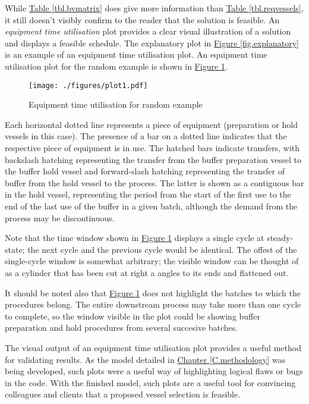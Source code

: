 While \hyperref[tbl.bvmatrix]{Table \ref*{tbl.bvmatrix}} does give more
information than \hyperref[tbl.reqvessels]{Table \ref*{tbl.reqvessels}},
it still doesn't visibly confirm to the reader that the solution is feasible.
An \emph{equipment time utilisation} plot provides a clear visual illustration
of a solution and displays a feasible schedule.
The explanatory plot in 
\hyperref[fig.explanatory]{Figure \ref*{fig.explanatory}} is an example of an
equipment time utilisation plot.  
An equipment time utilisation plot for the random example is shown in
\hyperref[fig.etu1]{Figure \ref*{fig.etu1}}.
\begin{figure}
    \centering
    \texttt{[image: ./figures/plot1.pdf]}
    \caption{Equipment time utilisation for random example}
    \label{fig.etu1}
\end{figure}
Each horizontal dotted line represents a piece of equipment (preparation or
hold vessels in this case).
The presence of a bar on a dotted line indicates that the respective piece of
equipment is in use.  
The hatched bars indicate transfers, with backslash hatching representing the
transfer from the buffer preparation vessel to the buffer hold vessel and
forward-slash hatching representing the transfer of buffer from the hold vessel
to the process.
The latter is shown as a contiguous bar in the hold vessel, representing the
period from the start of the first use to the end of the last use of the buffer
in a given batch, although the demand from the process may be discontinuous.

Note that the time window shown in \hyperref[fig.etu1]{Figure \ref*{fig.etu1}}
displays a single cycle at steady-state; the next cycle and the previous cycle
would be identical.
The offest of the single-cycle window is somewhat arbitrary; the
visible window can be thought of as a cylinder that has been cut at right a
angles to its ends and flattened out.

It should be noted also that \hyperref[fig.etu1]{Figure \ref*{fig.etu1}}
does not highlight the batches to which the procedures belong.
The entire downstream process may take more than one cycle to complete, so the
window visible in the plot could be showing buffer preparation and hold
procedures from several succesive batches.

The visual output of an equipment time utilisation plot provides a useful
method for validating results.
As the model detailed in 
\hyperref[C.methodology]{Chapter \ref*{C.methodology}} was being developed,
such plots were a useful way of highlighting logical flaws or bugs in the code.
With the finished model, such plots are a useful tool for convincing
colleagues and clients that a proposed vessel selection is feasible.

